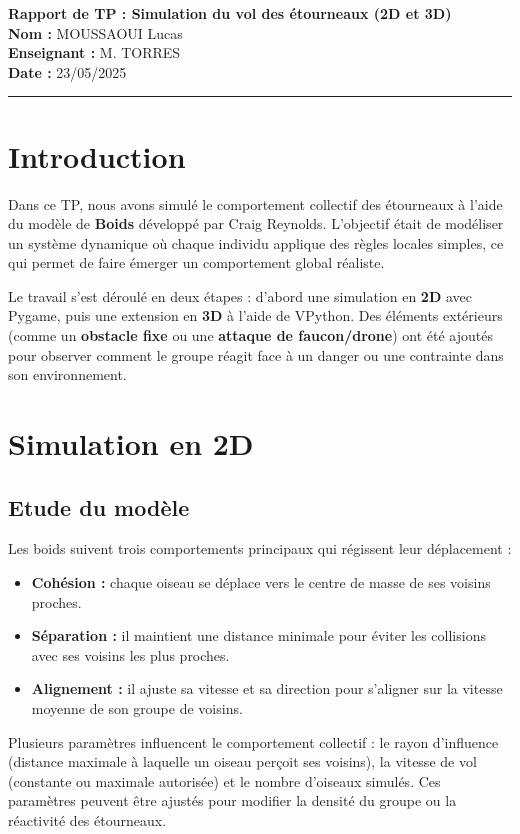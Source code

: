 \documentclass{article}
\begin{document}
\textbf{Rapport de TP : Simulation du vol des étourneaux (2D et 3D)}\\
\textbf{Nom :} MOUSSAOUI Lucas\\
\textbf{Enseignant :} M. TORRES\\
\textbf{Date :} 23/05/2025

\noindent\rule{\textwidth}{0.4pt}

\section{Introduction}

Dans ce TP, nous avons simulé le comportement collectif des étourneaux à l’aide du modèle de \textbf{Boids} développé par Craig Reynolds. L’objectif était de modéliser un système dynamique où chaque individu applique des règles locales simples, ce qui permet de faire émerger un comportement global réaliste.

Le travail s’est déroulé en deux étapes : d’abord une simulation en \textbf{2D} avec Pygame, puis une extension en \textbf{3D} à l’aide de VPython. Des éléments extérieurs (comme un \textbf{obstacle fixe} ou une \textbf{attaque de faucon/drone}) ont été ajoutés pour observer comment le groupe réagit face à un danger ou une contrainte dans son environnement.

\section{Simulation en 2D}
\subsection{Etude du modèle}
Les boids suivent trois comportements principaux qui régissent leur déplacement :
\begin{itemize}
  \item \textbf{Cohésion :} chaque oiseau se déplace vers le centre de masse de ses voisins proches.
  \item \textbf{Séparation :} il maintient une distance minimale pour éviter les collisions avec ses voisins les plus proches.
  \item \textbf{Alignement :} il ajuste sa vitesse et sa direction pour s’aligner sur la vitesse moyenne de son groupe de voisins.
\end{itemize}

Plusieurs paramètres influencent le comportement collectif : le rayon d’influence (distance maximale à laquelle un oiseau perçoit ses voisins), la vitesse de vol (constante ou maximale autorisée) et le nombre d’oiseaux simulés. Ces paramètres peuvent être ajustés pour modifier la densité du groupe ou la réactivité des étourneaux.
\end{document}
